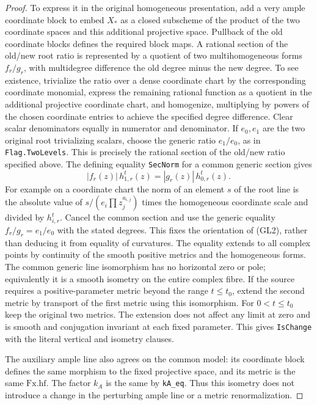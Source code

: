 \begin{proof}
To express it in the original homogeneous presentation,
add a very ample coordinate block to embed \(X_*\) as
a closed subscheme of the product of the two coordinate
spaces and this additional projective space. Pullback of
the old coordinate blocks defines the required block maps.
A rational section of the old/new root ratio is represented
by a quotient of two multihomogeneous forms \(f_r/g_r\),
with multidegree difference the old degree minus the new
degree. To see existence, trivialize the ratio over a
dense coordinate chart by the corresponding coordinate
monomial, express the remaining rational function as a
quotient in the additional projective coordinate chart,
and homogenize, multiplying by powers of the chosen
coordinate entries to achieve the specified degree
difference. Clear scalar denominators equally in numerator
and denominator. If \(e_0,e_1\) are the two original
root trivializing scalars, choose the generic ratio
\(e_1/e_0\), as in \texttt{Flag.TwoLevels}.
This is precisely the rational section of the old/new
ratio specified above. The defining equality
\texttt{SecNorm} for a common generic section gives
\[
              |f_r(z)|\,h^t_{1,r}(z)
                        =|g_r(z)|\,h^t_{0,r}(z).
                                                               \tag{GL2}
\]
For example on a coordinate chart the norm of an
element \(s\) of the root line is the absolute value of
\(s/(e_i\prod z_j^{a_{i,j}})\) times the homogeneous
coordinate scale and divided by \(h^t_{i,r}\).
Cancel the common section and use the generic equality
\(f_r/g_r=e_1/e_0\) with the stated degrees.
This fixes the orientation of (GL2), rather than
deducing it from equality of curvatures.
The equality extends to all complex points by continuity
of the smooth positive metrics and the homogeneous forms.
The common generic line isomorphism has no horizontal
zero or pole; equivalently it is a smooth isometry on
the entire complex fibre. If the source requires a
positive-parameter metric beyond the range \(t\le t_0\),
extend the second metric by transport of the first metric
using this isomorphism. For \(0<t\le t_0\) keep the
original two metrics. The extension does not affect any
limit at zero and is smooth and conjugation invariant
at each fixed parameter. This gives \texttt{IsChange}
with the literal vertical and isometry clauses.

The auxiliary ample line also agrees on the common model:
its coordinate block defines the same morphism to the
fixed projective space, and its metric is the same
\(\mathrm{Fx.hf}\). The factor \(k_A\) is the same by
\texttt{kA\_eq}. Thus this isometry does not introduce a
change in the perturbing ample line or a metric
renormalization.


\end{proof}
